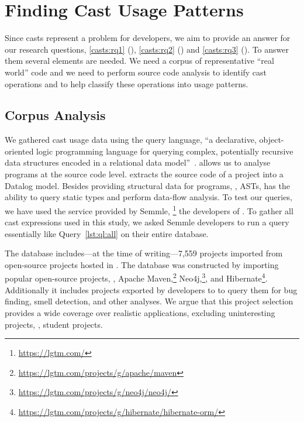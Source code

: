 \section{Finding Cast Usage Patterns}
\label{sec:casts:methodology}

Since casts represent a problem for developers,
we aim to provide an answer for our research questions,
\ref{casts:rq1} (\emph{\crqA}),
\ref{casts:rq2} (\emph{\crqB}) and
\ref{casts:rq3} (\emph{\crqC}).
To answer them several elements are needed.
We need a corpus of representative ``real world'' code and we need to perform
source code analysis to identify cast operations and to help classify these
operations into usage patterns.


\subsection*{Corpus Analysis}

We gathered cast usage data using the \ql{} query language,
``a declarative, object-oriented logic programming language for querying
complex, potentially recursive data structures encoded in a relational data
model''~\citep{avgustinovQLObjectorientedQueries2016}.
\ql{} allows us to analyse programs at the source code level.
\ql{} extracts the source code of a project into a Datalog model.
Besides providing structural data for programs, \ie{}, ASTs,
\ql{} has the ability to query static types and perform data-flow analysis.
To test our \ql{} queries,
we have used the \lgtm{} service provided by Semmle,%
\footnote{\url{https://lgtm.com/}}
the developers of \ql{}.
To gather all cast expressions used in this study,
we asked Semmle developers to run a query essentially like Query~\ref{lst:ql:all} on their entire database.

The \lgtm{} database includes---at the time of writing---7,559 \java{} projects imported from
open-source projects hosted in \github{}.
The \lgtm{} database was constructed by importing popular open-source projects, \eg{},
Apache Maven,\footnote{\url{https://lgtm.com/projects/g/apache/maven}}
Neo4j,\footnote{\url{https://lgtm.com/projects/g/neo4j/neo4j/}}, and
Hibernate\footnote{\url{https://lgtm.com/projects/g/hibernate/hibernate-orm/}}.
Additionally it includes projects exported by developers
to \lgtm{} to query them for bug finding, smell detection, and
other analyses.
We argue that this project selection provides a wide coverage over realistic
\java{} applications, excluding
uninteresting projects, \eg{}, student projects.



